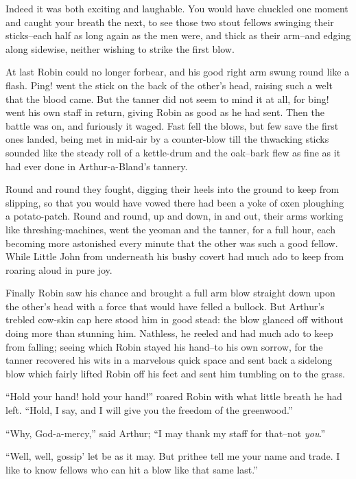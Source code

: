 Indeed it was both exciting and laughable. You would have chuckled one
moment and caught your breath the next, to see those two stout fellows
swinging their sticks--each half as long again as the men were, and
thick as their arm--and edging along sidewise, neither wishing to strike
the first blow.

At last Robin could no longer forbear, and his good right arm swung
round like a flash. Ping! went the stick on the back of the other's
head, raising such a welt that the blood came. But the tanner did not
seem to mind it at all, for bing! went his own staff in return, giving
Robin as good as he had sent. Then the battle was on, and furiously it
waged. Fast fell the blows, but few save the first ones landed, being
met in mid-air by a counter-blow till the thwacking sticks sounded like
the steady roll of a kettle-drum and the oak--bark flew as fine as it
had ever done in Arthur-a-Bland's tannery.

Round and round they fought, digging their heels into the ground to keep
from slipping, so that you would have vowed there had been a yoke of
oxen ploughing a potato-patch. Round and round, up and down, in and out,
their arms working like threshing-machines, went the yeoman and the
tanner, for a full hour, each becoming more astonished every minute that
the other was such a good fellow. While Little John from underneath his
bushy covert had much ado to keep from roaring aloud in pure joy.

Finally Robin saw his chance and brought a full arm blow straight down
upon the other's head with a force that would have felled a bullock. But
Arthur's trebled cow-skin cap here stood him in good stead: the blow
glanced off without doing more than stunning him. Nathless, he reeled
and had much ado to keep from falling; seeing which Robin stayed his
hand--to his own sorrow, for the tanner recovered his wits in a
marvelous quick space and sent back a sidelong blow which fairly lifted
Robin off his feet and sent him tumbling on to the grass.

``Hold your hand! hold your hand!'' roared Robin with what little breath
he had left. ``Hold, I say, and I will give you the freedom of the
greenwood.''

``Why, God-a-mercy,'' said Arthur; ``I may thank my staff for that--not
\emph{you}.''

``Well, well, gossip' let be as it may. But prithee tell me your name
and trade. I like to know fellows who can hit a blow like that same
last.''


